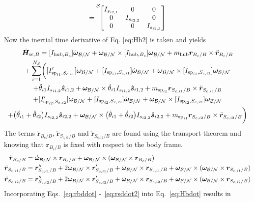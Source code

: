 \documentclass[paper]{aiaaNew}
\begin{document}
	\begin{equation}
	[I_{\text{sp}_{i2},S_{c,i2}}] = \leftexp{S}{\begin{bmatrix}
		I_{s_{i2,1}} & 0 & 0 \\
		0 & I_{s_{i2,2}} & 0 \\
		0 & 0 & I_{s_{i2,3}}
		\end{bmatrix}}
	\end{equation}
	Now the inertial time derivative of Eq. \eqref{eq:Hb2} is taken and yields
	\begin{multline}
	\dot{\bm{H}}_{\text{sc},B} = [I_{\text{hub},B_c}] \dot{\bm\omega}_{\cal B/N} + \bm\omega_{\cal B/N} \times [I_{\text{hub},B_c}] \bm\omega_{\cal B/N} + m_{\text{hub}} \bm{r}_{B_c/B}\times\ddot{\bm r}_{B_c/B}\\ +\sum\limits_{i=1}^{N_S} \biggl( [I'_{\text{sp}_{i1},S_{c,i1}}] \bm\omega_{\cal B/N} + [I_{\text{sp}_{i1},S_{c,i1}}] \dot{\bm\omega}_{\cal B/N} + \bm\omega_{\cal B/N} \times [I_{\text{sp}_{i1},S_{c,i1}}] \bm\omega_{\cal B/N}\\ 
	+ \ddot{\theta}_{i1} I_{s_{i1,2}}\bm{\hat{s}}_{i1,2}+ \bm\omega_{\cal B/N} \times \dot{\theta}_{i1} I_{s_{i1,2}}\bm{\hat{s}}_{i1,2} +m_{\text{sp}_{i1}} \bm{r}_{S_{c,i1}/B} \times \ddot{\bm r}_{S_{c,i1}/B}\\
	+ [I'_{\text{sp}_{i2},S_{c,i2}}] \bm\omega_{\cal B/N} + [I_{\text{sp}_{i2},S_{c,i2}}] \dot{\bm\omega}_{\cal B/N} + \bm\omega_{\cal B/N} \times [I_{\text{sp}_{i2},S_{c,i2}}] \bm\omega_{\cal B/N}\\ 
	+ \big(\ddot{\theta}_{i1} + \ddot{\theta}_{i2}\big) I_{s_{i2,2}}\bm{\hat{s}}_{i2,2}+ \bm\omega_{\cal B/N} \times \big(\dot{\theta}_{i1} + \dot{\theta}_{i2}\big) I_{s_{i2,2}}\bm{\hat{s}}_{i2,2} +m_{\text{sp}_{i1}} \bm{r}_{S_{c,i2}/B} \times \ddot{\bm r}_{S_{c,i2}/B}\biggr)
	\label{eq:Hbdot}
	\end{multline}
	The terms $\ddot{\bm r}_{B_c/B}$, $\ddot{\bm r}_{S_{c,i1}/B}$ and $\ddot{\bm r}_{S_{c,i2}/B}$ are found using the transport theorem and knowing that $\bm{r}_{B_c/B}$ is fixed with respect to the body frame.
	\begin{align}
	\ddot{\bm r}_{B_c/B} &= \bm{\dot{\omega}}_{\cal B/N} \times \bm{r}_{B_c/B} + \bm\omega_{\cal B/N} \times (\bm\omega_{\cal B/N} \times \bm{r}_{B_c/B})
	\label{eq:rbddot}
	\\
	\ddot{\bm r}_{S_{c,i1}/B} &= \bm{r}''_{S_{c,i1}/B} + 2 \bm\omega_{\cal B/N} \times \bm{r}'_{S_{c,i1}/B} +  \dot{\bm\omega}_{\cal B/N} \times \bm{r}_{S_{c,i1}/B} + \bm\omega_{\cal B/N} \times (\bm\omega_{\cal B/N} \times \bm{r}_{S_{c,i1}/B})
	\label{eq:rsddot}
    \\
	\ddot{\bm r}_{S_{c,i2}/B} &= \bm{r}''_{S_{c,i2}/B} + 2 \bm\omega_{\cal B/N} \times \bm{r}'_{S_{c,i2}/B} +  \dot{\bm\omega}_{\cal B/N} \times \bm{r}_{S_{c,i2}/B} + \bm\omega_{\cal B/N} \times (\bm\omega_{\cal B/N} \times \bm{r}_{S_{c,i2}/B})
	\label{eq:rsddot2}
	\end{align}
	Incorporating Eqs.~\eqref{eq:rbddot} -~\eqref{eq:rsddot2} into Eq.~\eqref{eq:Hbdot} results in
\end{document}
